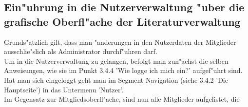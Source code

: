 \subsection{Ein"uhrung in die Nutzerverwaltung "uber die grafische Oberfl"ache der Literaturverwaltung}
Grunds"atzlich gilt, dass man "anderungen in den Nutzerdaten der Mitglieder ausschlie"slich als Administrator durchf"uhren darf.\\
Um in die Nutzerverwaltung zu gelangen, befolgt man zun"achst die selben Anweisungen, wie sie im Punkt 3.4.4 'Wie logge ich mich ein?' aufgef"uhrt sind.\\
Hat man sich eingeloggt geht man im Segment Navigation (siehe 3.4.2 'Die Hauptseite') in das Untermenu 'Nutzer'.\\
Im Gegensatz zur Mitgliedsoberfl"ache, sind nun alle Mitglieder aufgelistet, die 